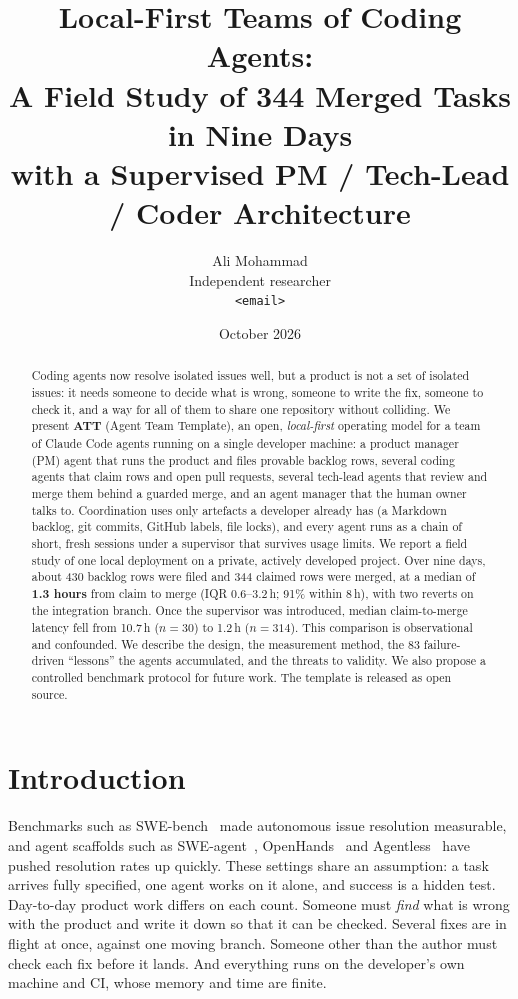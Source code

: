 \documentclass[11pt]{article}
\title{\textbf{Local-First Teams of Coding Agents:}\\
A Field Study of 344 Merged Tasks in Nine Days\\
with a Supervised PM / Tech-Lead / Coder Architecture}
\author{Ali Mohammad\\Independent researcher\\\texttt{<email>}}
\date{October 2026}
\begin{document}
\maketitle

\begin{abstract}
Coding agents now resolve isolated issues well, but a product is not a set of
isolated issues: it needs someone to decide what is wrong, someone to write the
fix, someone to check it, and a way for all of them to share one repository
without colliding. We present \textbf{ATT} (Agent Team Template), an open,
\emph{local-first} operating model for a team of Claude Code agents running on a
single developer machine: a product manager (PM) agent that runs the product
and files provable backlog rows, several coding agents that claim rows and open
pull requests, several tech-lead agents that review and merge them behind a
guarded merge, and an agent manager that the human owner talks to. Coordination
uses only artefacts a developer already has (a Markdown backlog, git commits,
GitHub labels, file locks), and every agent runs as a chain of short, fresh
sessions under a supervisor that survives usage limits. We report a field study
of one local deployment on a private, actively developed project. Over
nine days, about 430 backlog rows were filed and 344 claimed rows were merged,
at a median of \textbf{1.3 hours} from claim to merge (IQR 0.6--3.2\,h; 91\%
within 8\,h), with two reverts on the integration branch. Once the supervisor
was introduced, median claim-to-merge latency fell from 10.7\,h ($n{=}30$) to
1.2\,h ($n{=}314$). This comparison is observational and confounded. We describe
the design, the measurement method, the 83 failure-driven ``lessons'' the agents
accumulated, and the threats to validity. We also propose a controlled
benchmark protocol for future work. The template is released as open source.
\end{abstract}

\section{Introduction}

Benchmarks such as SWE-bench~\citep{jimenez2024swebench} made autonomous issue
resolution measurable, and agent scaffolds such as
SWE-agent~\citep{yang2024sweagent}, OpenHands~\citep{wang2024openhands} and
Agentless~\citep{xia2024agentless} have pushed resolution rates up quickly.
These settings share an assumption: a task arrives fully specified, one agent
works on it alone, and success is a hidden test. Day-to-day product work
differs on each count. Someone must \emph{find} what is wrong with the product
and write it down so that it can be checked. Several fixes are in flight at
once, against one moving branch. Someone other than the author must check each
fix before it lands. And everything runs on the developer's own machine and CI,
whose memory and time are finite.
\end{document}

